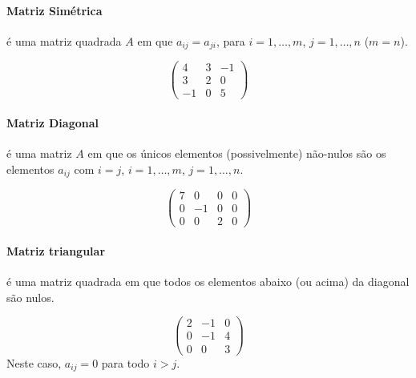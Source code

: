 \paragraph*{Matriz Simétrica} é uma matriz quadrada $A$ em que $a_{ij}=a_{ji}$, para $i=1,\ldots,m$, $j=1,\ldots,n$ ($m=n$).
\begin{exemplo}
    \begin{equation*}
        \begin{pmatrix}
           4 & 3 & -1\\
           3 & 2 & 0\\
           -1 & 0 & 5
        \end{pmatrix}
    \end{equation*}
\end{exemplo}

\paragraph*{Matriz Diagonal} é uma matriz $A$ em que os únicos elementos (possivelmente) não-nulos são os elementos $a_{ij}$ com $i=j$, $i=1,\ldots,m$, $j=1,\ldots,n$. 
\begin{exemplo}
    \begin{equation*}
        \begin{pmatrix}
        	7 & 0 & 0 & 0\\
            0 & -1 & 0 & 0\\
            0 & 0 & 2 & 0
        \end{pmatrix}
    \end{equation*}
\end{exemplo}

\paragraph*{Matriz triangular} é uma matriz quadrada em que todos os elementos abaixo (ou acima) da diagonal são nulos. 
\begin{exemplo}
    \begin{equation*}
        \begin{pmatrix}
                2 & -1 & 0\\
                0 & -1 & 4\\
                0 & 0 & 3
        \end{pmatrix}
    \end{equation*}
    Neste caso, $a_{ij}=0$ para todo $i>j$.
\end{exemplo}

